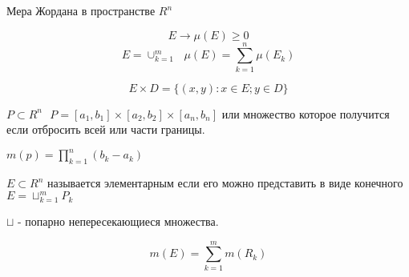 \begin{title}
  Мера Жордана в пространстве $R^n$
\end{title}

\begin{defin}
  $$
  E \to \mu (E) \ge 0
  $$
  $$
  E = \cup_{k=1}^m ~~~ \mu(E) = \sum_{k=1}^n \mu (E_k)
  $$
\end{defin}

\begin{defin}
   $$
   E \times D = \{ (x,y): x \in E; y \in D \}
   $$
\end{defin}

\begin{defin}[параллелипипеда]
  $P \subset R^n ~~~ P = [a_1, b_1] \times [a_2, b_2] \times [a_n, b_n]$ или
множество которое получится если отбросить всей или части границы.

  $m(p) = \prod_{k=1}^n (b_k - a_k)$

  $E \subset R^n$ называется элементарным если его можно представить в виде
конечного $E = \sqcup_{k=1}^m P_k$

  $\sqcup$ - попарно непересекающиеся множества.
\end{defin}

$$
m (E) = \sum_{k=1}^m m(R_k)
$$